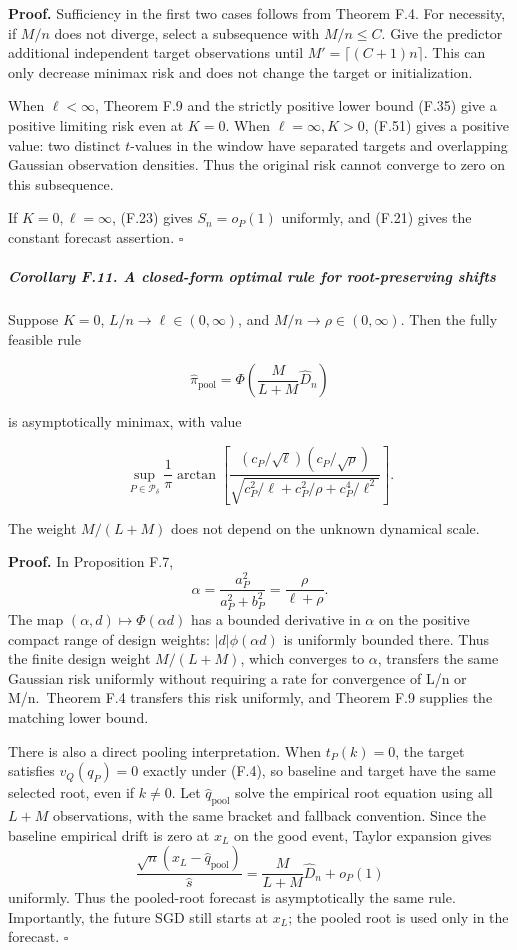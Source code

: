 \textbf{Proof.} Sufficiency in the first two cases follows from Theorem
F.4. For necessity, if \(M/n\) does not diverge, select a subsequence
with \(M/n\le C\). Give the predictor additional independent target
observations until \(M'=\lceil(C+1)n\rceil\). This can only decrease
minimax risk and does not change the target or initialization.

When \(\ell<\infty\), Theorem F.9 and the strictly positive lower bound
(F.35) give a positive limiting risk even at \(K=0\). When
\(\ell=\infty,K>0\), (F.51) gives a positive value: two distinct
\(t\)-values in the window have separated targets and overlapping
Gaussian observation densities. Thus the original risk cannot converge
to zero on this subsequence.

If \(K=0,\ell=\infty\), (F.23) gives \(S_n=o_P(1)\) uniformly, and
(F.21) gives the constant forecast assertion. \(\square\)

\subparagraph{Corollary F.11. A closed-form optimal rule for
root-preserving
shifts}\label{corollary-f.11.-a-closed-form-optimal-rule-for-root-preserving-shifts}

Suppose \(K=0\), \(L/n\to\ell\in(0,\infty)\), and
\(M/n\to\rho\in(0,\infty)\). Then the fully feasible rule

\[
\boxed{
\widehat\pi_{\mathrm{pool}}
=\Phi\!\left(\frac{M}{L+M}\widehat D_n\right)
}
\tag{F.54}
\]

is asymptotically minimax, with value

\[
\sup_{P\in\mathcal P_\delta}
\frac1\pi\arctan
\left[
\frac{(c_P/\sqrt\ell)(c_P/\sqrt\rho)}
{\sqrt{c_P^2/\ell+c_P^2/\rho+c_P^4/\ell^2}}
\right].
\tag{F.55}
\]

The weight \(M/(L+M)\) does not depend on the unknown dynamical scale.

\textbf{Proof.} In Proposition F.7, \[
\alpha=\frac{a_P^2}{a_P^2+b_P^2}
=\frac{\rho}{\ell+\rho}.
\] The map \((\alpha,d)\mapsto\Phi(\alpha d)\) has a bounded derivative
in \(\alpha\) on the positive compact range of design weights:
\(|d|\phi(\alpha d)\) is uniformly bounded there. Thus the finite design
weight \(M/(L+M)\), which converges to \(\alpha\), transfers the same
Gaussian risk uniformly without requiring a rate for convergence of L/n
or M/n.~Theorem F.4 transfers this risk uniformly, and Theorem F.9
supplies the matching lower bound.

There is also a direct pooling interpretation. When \(t_P(k)=0\), the
target satisfies \(v_Q(q_P)=0\) exactly under (F.4), so baseline and
target have the same selected root, even if \(k\ne0\). Let
\(\widehat q_{\mathrm{pool}}\) solve the empirical root equation using
all \(L+M\) observations, with the same bracket and fallback convention.
Since the baseline empirical drift is zero at \(x_L\) on the good event,
Taylor expansion gives \[
\frac{\sqrt n(x_L-\widehat q_{\mathrm{pool}})}{\widehat s}
=\frac{M}{L+M}\widehat D_n+o_P(1)
\] uniformly. Thus the pooled-root forecast is asymptotically the same
rule. Importantly, the future SGD still starts at \(x_L\); the pooled
root is used only in the forecast. \(\square\)

